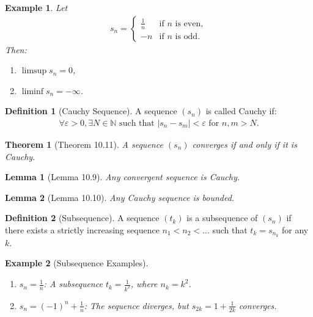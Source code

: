\documentclass[7pt]{article}
\theoremstyle{definition}
\newtheorem{definition}{Definition}
\theoremstyle{plain}
\newtheorem{theorem}{Theorem}
\newtheorem{example}{Example}
\newtheorem{lemma}{Lemma}
\begin{document}
\begin{example}
Let \begin{align}
    s_n = 
\begin{cases} 
\frac{1}{n} & \text{if } n \text{ is even}, \\
-n & \text{if } n \text{ is odd}.
\end{cases}
\end{align} 
Then:
\begin{enumerate}
    \item $ \limsup s_n = 0 $,
    \item $ \liminf s_n = -\infty $.
\end{enumerate}
\end{example}

\begin{definition}[Cauchy Sequence]
A sequence $ (s_n) $ is called Cauchy if:
\begin{align}
\forall \varepsilon > 0, \exists N \in \mathbb{N} \text{ such that } |s_n - s_m| < \varepsilon \text{ for } n, m > N.
\end{align}
\end{definition}

\begin{theorem}[Theorem 10.11]
A sequence $ (s_n) $ converges if and only if it is Cauchy.
\end{theorem}

\begin{lemma}[Lemma 10.9]
Any convergent sequence is Cauchy.
\end{lemma}

\begin{lemma}[Lemma 10.10]
Any Cauchy sequence is bounded.
\end{lemma}

\begin{definition}[Subsequence]
A sequence $ (t_k) $ is a subsequence of $ (s_n) $ if there exists a strictly increasing sequence $ n_1 < n_2 < \ldots $ such that $ t_k = s_{n_k} $ for any $ k $.
\end{definition}

\begin{example}[Subsequence Examples]

\begin{enumerate}
    \item $ s_n = \frac{1}{n} $: A subsequence $ t_k = \frac{1}{k^2} $, where $ n_k = k^2 $.
    \item $ s_n = (-1)^n + \frac{1}{n} $: The sequence diverges, but $ s_{2k} = 1 + \frac{1}{2k} $ converges.
\end{enumerate}
\end{example}
\end{document}
